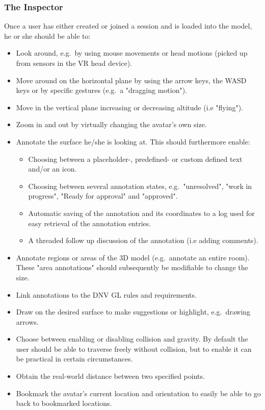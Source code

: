 \subsubsection{The Inspector}
Once a user has either created or joined a session and is loaded into the model, he or she should be able to:
\begin{itemize}
	\item Look around, e.g.~by using mouse movements or head motions (picked up from sensors in the VR head device).
	\item Move around on the horizontal plane by using the arrow keys, the WASD keys or by specific gestures (e.g.~a "dragging motion").
	\item Move in the vertical plane increasing or decreasing altitude (i.e "flying").
	\item Zoom in and out by virtually changing the avatar's own size.
	\item Annotate the surface he/she is looking at. This should furthermore enable:
	\begin{itemize}
		\item Choosing between a placeholder-, predefined- or custom defined text and/or an icon.
		\item Choosing between several annotation states,  e.g.~"unresolved", "work in progress", "Ready for approval" and "approved".
		\item Automatic saving of the annotation and its coordinates to a log used for easy retrieval of the annotation entries. 
		\item A threaded follow up discussion of the annotation (i.e adding comments).
	\end{itemize}
	\item Annotate regions or areas of the 3D model (e.g.~annotate an entire room). These "area annotations" should subsequently be modifiable to change the size. 
	\item Link annotations to the DNV GL rules and requirements.
	\item Draw on the desired surface to make suggestions or highlight, e.g.~drawing arrows.
	\item Choose between enabling or disabling collision and gravity. By default the user should be able to traverse freely without collision, but to enable it can be practical in certain circumstances.
	\item Obtain the real-world distance between two specified points.
	\item Bookmark the avatar's current location and orientation to easily be able to go back to bookmarked locations. 
\end{itemize}

